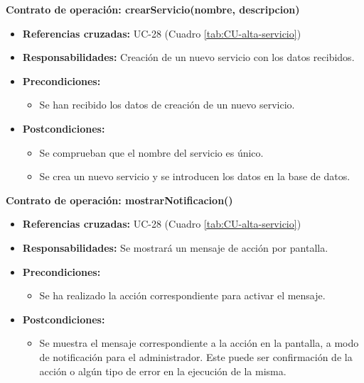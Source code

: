 \textbf{Contrato de operación: crearServicio(nombre, descripcion)}
\begin{itemize}
\item \textbf{Referencias cruzadas:} UC-28 (Cuadro \ref{tab:CU-alta-servicio})
\item \textbf{Responsabilidades:} Creación de un nuevo servicio con los datos recibidos.
\item \textbf{Precondiciones:} 
 \begin{itemize}
\item Se han recibido los datos de creación de un nuevo servicio.
\end {itemize}
\item \textbf{Postcondiciones:} 
 \begin{itemize}
 \item Se comprueban que el nombre del servicio es único.
\item Se crea un nuevo servicio y se introducen los datos en la base de datos.
\end {itemize}
\end {itemize}

\textbf{Contrato de operación: mostrarNotificacion()}
\begin{itemize}
\item \textbf{Referencias cruzadas:} UC-28 (Cuadro \ref{tab:CU-alta-servicio})
\item \textbf{Responsabilidades:} Se mostrará un mensaje de acción por pantalla.
\item \textbf{Precondiciones:} 
 \begin{itemize}
\item Se ha realizado la acción correspondiente para activar el mensaje.
\end {itemize}
\item \textbf{Postcondiciones:} 
 \begin{itemize}
\item Se muestra el mensaje correspondiente a la acción en la pantalla, a modo de notificación para el administrador. Este puede ser confirmación de la acción o algún tipo de error en la ejecución de la misma.
\end {itemize}
\end {itemize}


\vspace{7mm}
\dotfill
\vspace{7mm}

